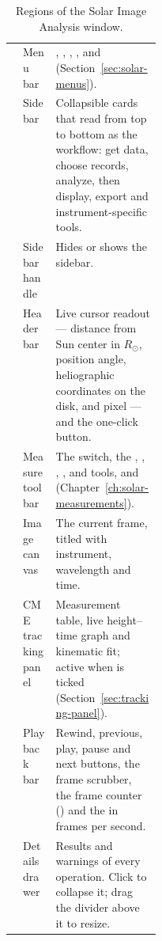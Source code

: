 \begin{table}[!htbp]
  \centering
  \caption{Regions of the Solar Image Analysis window.}
  \label{tab:solar-regions}
  \small
  \begin{tabularx}{\linewidth}{@{}cP{0.22\linewidth}L@{}}
    \toprule
     &  &  \\
    \midrule
     & Menu bar & , , , ,  and  (Section~\ref{sec:solar-menus}). \\
     & Sidebar & Collapsible cards that read from top to bottom as the workflow: get data, choose records, analyze, then display, export and instrument-specific tools. \\
     & Sidebar handle & Hides or shows the sidebar. \\
     & Header bar & Live cursor readout --- distance from Sun center in \(R_\odot\), position angle, heliographic coordinates on the disk, and pixel --- and the one-click  button. \\
     & Measure toolbar & The  switch, the , , , ,  and  tools, and  (Chapter~\ref{ch:solar-measurements}). \\
     & Image canvas & The current frame, titled with instrument, wavelength and time. \\
     & CME tracking panel & Measurement table, live height--time graph and kinematic fit; active when  is ticked (Section~\ref{sec:tracking-panel}). \\
     & Playback bar & Rewind, previous, play, pause and next buttons, the frame scrubber, the frame counter () and the  in frames per second. \\
     & Details drawer & Results and warnings of every operation. Click  to collapse it; drag the divider above it to resize. \\
    \bottomrule
  \end{tabularx}
\end{table}


